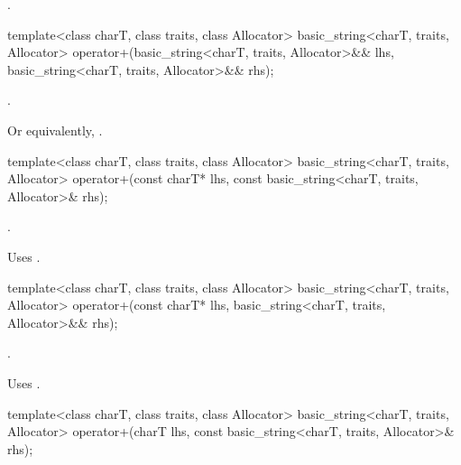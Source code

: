 \begin{itemdescr}
\pnum
\returns
{}.
\end{itemdescr}

%
\begin{itemdecl}
template<class charT, class traits, class Allocator>
  basic_string<charT, traits, Allocator>
    operator+(basic_string<charT, traits, Allocator>&& lhs,
              basic_string<charT, traits, Allocator>&& rhs);
\end{itemdecl}

\begin{itemdescr}
\pnum
\returns
{}.
\begin{note}
Or equivalently, .
\end{note}
\end{itemdescr}

%
\begin{itemdecl}
template<class charT, class traits, class Allocator>
  basic_string<charT, traits, Allocator>
    operator+(const charT* lhs, const basic_string<charT, traits, Allocator>& rhs);
\end{itemdecl}

\begin{itemdescr}
\pnum
\returns
{}.

\pnum
\remarks
Uses
.
\end{itemdescr}

%
\begin{itemdecl}
template<class charT, class traits, class Allocator>
  basic_string<charT, traits, Allocator>
    operator+(const charT* lhs, basic_string<charT, traits, Allocator>&& rhs);
\end{itemdecl}

\begin{itemdescr}
\pnum
\returns
{}.

\pnum
\remarks
Uses
.
\end{itemdescr}

%
\begin{itemdecl}
template<class charT, class traits, class Allocator>
  basic_string<charT, traits, Allocator>
    operator+(charT lhs, const basic_string<charT, traits, Allocator>& rhs);
\end{itemdecl}

